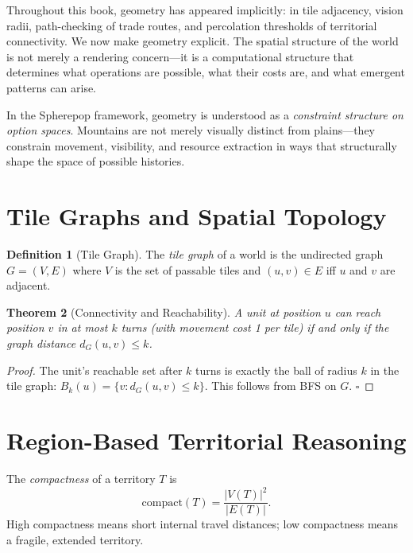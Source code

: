 \documentclass[11pt,a4paper,openany]{book}
\theoremstyle{plain}
\newtheorem{theorem}{Theorem}[chapter]
\theoremstyle{definition}
\newtheorem{definition}[theorem]{Definition}
\theoremstyle{remark}
\newenvironment{background}{%
  \begin{mdframed}[
    linecolor=sphereblue!40, backgroundcolor=sphereblue!5,
    linewidth=1pt, innertopmargin=8pt, innerbottommargin=8pt,
    innerleftmargin=10pt, innerrightmargin=10pt,
    skipabove=10pt, skipbelow=6pt
  ]%
  \setlength{\parindent}{0pt}%
  \noindent{\textcolor{sphereblue}{\textbf{Background}}}\par\smallskip\ignorespaces
}{\end{mdframed}}
\newenvironment{defbox}[1]{%
  \begin{tcolorbox}[
    title={\textbf{Definition:} #1},
    colback=defbg,
    colframe=sphereamber!80,
    fonttitle=\bfseries,
    coltitle=sphereamber!60!black,
    sharp corners,
    breakable,
    before upper={\normalfont\setlength{\parindent}{0pt}\tolerance=9999\hbadness=9999}
  ]
}{\end{tcolorbox}}
\begin{document}
\begin{background}
  Throughout this book, geometry has appeared implicitly: in tile
  adjacency, vision radii, path-checking of trade routes, and
  percolation thresholds of territorial connectivity. We now make
  geometry explicit. The spatial structure of the world is not merely
  a rendering concern---it is a computational structure that determines
  what operations are possible, what their costs are, and what emergent
  patterns can arise.

  In the Spherepop framework, geometry is understood as a
  \emph{constraint structure on option spaces}. Mountains are not merely
  visually distinct from plains---they constrain movement, visibility,
  and resource extraction in ways that structurally shape the space of
  possible histories.
\end{background}

\section{Tile Graphs and Spatial Topology}

\begin{definition}[Tile Graph]
  The \emph{tile graph} of a world is the undirected graph $G = (V, E)$
  where $V$ is the set of passable tiles and $(u, v) \in E$ iff $u$ and
  $v$ are adjacent.
\end{definition}

\begin{theorem}[Connectivity and Reachability]
  A unit at position $u$ can reach position $v$ in at most $k$ turns
  (with movement cost 1 per tile) if and only if the graph distance
  $d_G(u, v) \leq k$.
\end{theorem}
\begin{proof}
  The unit's reachable set after $k$ turns is exactly the ball of
  radius $k$ in the tile graph: $B_k(u) = \{v : d_G(u,v) \leq k\}$.
  This follows from BFS on $G$. $\square$
\end{proof}

\section{Region-Based Territorial Reasoning}

\begin{defbox}{Territorial Compactness}
  The \emph{compactness} of a territory $T$ is
  \[
    \mathrm{compact}(T) = \frac{|V(T)|^2}{|E(T)|}.
  \]
  High compactness means short internal travel distances; low compactness
  means a fragile, extended territory.
\end{defbox}
\end{document}

